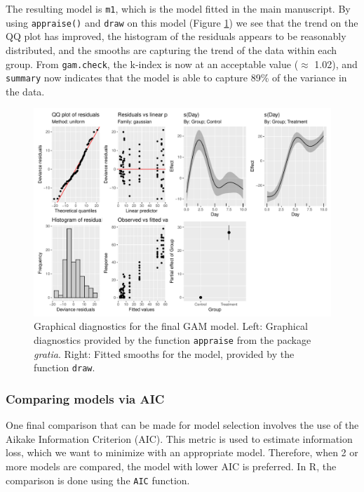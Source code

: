 \documentclass[
]{article}
\newcommand{\passthrough}[1]{#1}
\begin{document}
The resulting model is \passthrough{\lstinline!m1!}, which is the model fitted in the main manuscript. By using \passthrough{\lstinline!appraise()!} and \passthrough{\lstinline!draw!} on this model (Figure \ref{fig:final-GAM-diag}) we see that the trend on the QQ plot has improved, the histogram of the residuals appears to be reasonably distributed, and the smooths are capturing the trend of the data within each group. From \passthrough{\lstinline!gam.check!}, the k-index is now at an acceptable value (\(\approx\) 1.02), and \passthrough{\lstinline!summary!} now indicates that the model is able to capture 89\% of the variance in the data.



\begin{figure}[H]

{\centering \includegraphics[width=0.75\linewidth,]{00-Full_document_files/figure-latex/final-GAM-diag-1} 

}

\caption{Graphical diagnostics for the final GAM model. Left: Graphical diagnostics provided by the function \passthrough{\lstinline!appraise!} from the package \emph{gratia}. Right: Fitted smooths for the model, provided by the function \passthrough{\lstinline!draw!}.}\label{fig:final-GAM-diag}
\end{figure}

\hypertarget{comparing-models-via-aic}{%
\subsubsection{Comparing models via AIC}\label{comparing-models-via-aic}}

One final comparison that can be made for model selection involves the use of the Aikake Information Criterion (AIC). This metric is used to estimate information loss, which we want to minimize with an appropriate model. Therefore, when 2 or more models are compared, the model with lower AIC is preferred. In R, the comparison is done using the \passthrough{\lstinline!AIC!} function.
\end{document}
